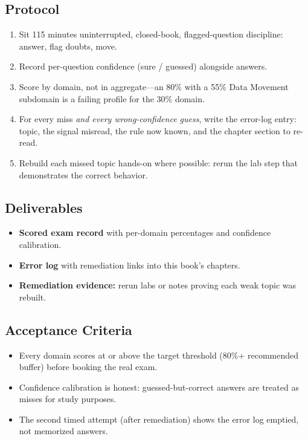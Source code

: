 \subsection*{Protocol}
\begin{enumerate}
    \item Sit 115 minutes uninterrupted, closed-book, flagged-question discipline: answer, flag doubts, move.
    \item Record per-question confidence (sure / guessed) alongside answers.
    \item Score by domain, not in aggregate---an 80\% with a 55\% Data Movement subdomain is a failing profile for the 30\% domain.
    \item For every miss \emph{and every wrong-confidence guess}, write the error-log entry: topic, the signal misread, the rule now known, and the chapter section to re-read.
    \item Rebuild each missed topic hands-on where possible: rerun the lab step that demonstrates the correct behavior.
\end{enumerate}

\subsection*{Deliverables}
\begin{itemize}
    \item \textbf{Scored exam record} with per-domain percentages and confidence calibration.
    \item \textbf{Error log} with remediation links into this book's chapters.
    \item \textbf{Remediation evidence:} rerun labs or notes proving each weak topic was rebuilt.
\end{itemize}

\subsection*{Acceptance Criteria}
\begin{itemize}
    \item Every domain scores at or above the target threshold (80\%+ recommended buffer) before booking the real exam.
    \item Confidence calibration is honest: guessed-but-correct answers are treated as misses for study purposes.
    \item The second timed attempt (after remediation) shows the error log emptied, not memorized answers.
\end{itemize}

